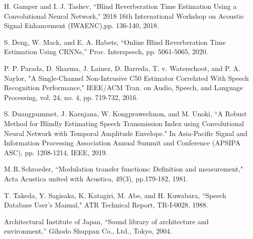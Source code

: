 \documentclass[conference]{IEEEtran}
\begin{document}
\begin{thebibliography}{99}
		H. Gamper and I. J. Tashev, ``Blind Reverberation Time Estimation Using a Convolutional Neural Network," 2018 16th International Workshop on Acoustic Signal Enhancement (IWAENC),pp. 136-140, 2018.%
		
		S. Deng, W. Mack, and E. A. Habets, ``Online Blind Reverberation Time Estimation Using CRNNs,'' Proc. Interspeech, pp. 5061-5065, 2020.
		
		P. P. Parada, D. Sharma, J. Lainez, D. Barreda, T. v. Waterschoot, and P. A. Naylor, "A Single-Channel Non-Intrusive C50 Estimator Correlated With Speech Recognition Performance," IEEE/ACM Tran. on Audio, Speech, and Language Processing, vol. 24, no. 4, pp. 719-732, 2016.
		
		
		S. Duangpummet, J. Karnjana, W. Kongprawechnon, and M. Unoki, ``A Robust Method for Blindly Estimating Speech Transmission Index using Convolutional Neural Network with Temporal Amplitude Envelope." In Asia-Pacific Signal and Information Processing Association Annual Summit and Conference (APSIPA ASC), pp. 1208-1214, IEEE, 2019.
		
		M.\,R.\,Schroeder, ``Modulation transfer functions: Definition and measurement," Acta Acustica united with Acustica, 49(3), pp.179-182, 1981.
		
		T. Takeda, Y. Sagisaka, K. Katagiri, M. Abe, and H. Kuwabara, ``Speech Database User’s Manual," ATR Technical Report, TR-I-0028, 1988.
		
		Architectural Institute of Japan, ``Sound library of architecture and environment,'' Gihodo Shuppan Co., Ltd., Tokyo, 2004.
	\end{thebibliography}
\end{document}
